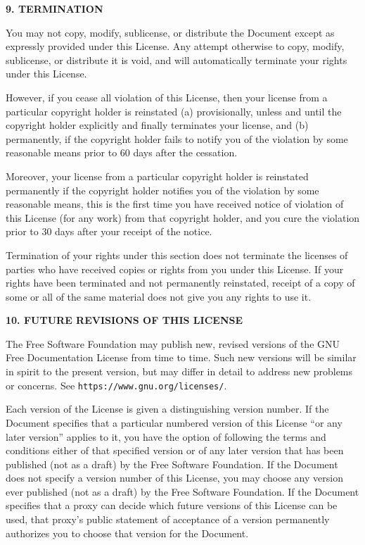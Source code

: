 \documentclass[a4paper,12pt]{book}
\begin{document}
\begin{center}
{\Large\bf 9. TERMINATION\par}
{}
\end{center}


You may not copy, modify, sublicense, or distribute the Document
except as expressly provided under this License.  Any attempt
otherwise to copy, modify, sublicense, or distribute it is void, and
will automatically terminate your rights under this License.

However, if you cease all violation of this License, then your license
from a particular copyright holder is reinstated (a) provisionally,
unless and until the copyright holder explicitly and finally
terminates your license, and (b) permanently, if the copyright holder
fails to notify you of the violation by some reasonable means prior to
60 days after the cessation.

Moreover, your license from a particular copyright holder is
reinstated permanently if the copyright holder notifies you of the
violation by some reasonable means, this is the first time you have
received notice of violation of this License (for any work) from that
copyright holder, and you cure the violation prior to 30 days after
your receipt of the notice.

Termination of your rights under this section does not terminate the
licenses of parties who have received copies or rights from you under
this License.  If your rights have been terminated and not permanently
reinstated, receipt of a copy of some or all of the same material does
not give you any rights to use it.


\begin{center}
{\Large\bf 10. FUTURE REVISIONS OF THIS LICENSE\par}
{}
\end{center}


The Free Software Foundation may publish new, revised versions
of the GNU Free Documentation License from time to time.  Such new
versions will be similar in spirit to the present version, but may
differ in detail to address new problems or concerns.  See
\texttt{https://www.gnu.org/licenses/}.

Each version of the License is given a distinguishing version number.
If the Document specifies that a particular numbered version of this
License ``or any later version'' applies to it, you have the option of
following the terms and conditions either of that specified version or
of any later version that has been published (not as a draft) by the
Free Software Foundation.  If the Document does not specify a version
number of this License, you may choose any version ever published (not
as a draft) by the Free Software Foundation.  If the Document
specifies that a proxy can decide which future versions of this
License can be used, that proxy's public statement of acceptance of a
version permanently authorizes you to choose that version for the
Document.
\end{document}
